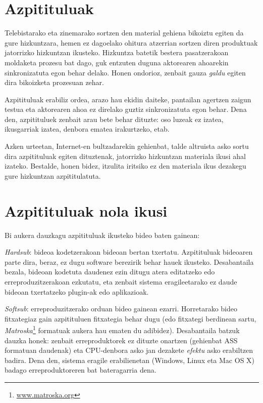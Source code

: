 \section{Azpitituluak}
Telebistarako eta zinemarako sortzen den material gehiena bikoiztu egiten da gure hizkuntzara, hemen ez dagoelako ohitura atzerrian sortzen diren produktuak jatorrizko hizkuntzan ikusteko. Hizkuntza batetik bestera pasatzerakoan moldaketa prozesu bat dago, guk entzuten duguna aktorearen ahoarekin sinkronizatuta egon behar delako. Honen ondorioz, zenbait gauza \textit{galdu} egiten dira bikoizketa prozesuan zehar.

Azpitituluak erabiliz ordea, arazo hau ekidin daiteke, pantailan agertzen zaigun testua eta aktorearen ahoa ez direlako guztiz sinkronizatuta egon behar. Dena den, azpitituluek zenbait arau bete behar dituzte: oso luzeak ez izatea, ikusgarriak izatea, denbora ematea irakurtzeko, etab.

Azken urteetan, Internet-en bultzadarekin gehienbat, talde altruista asko sortu dira azpitituluak egiten dituztenak, jatorrizko hizkuntzan materiala ikusi ahal izateko. Bestalde, honen bidez, itzulita iritsiko ez den materiala ikus dezakegu gure hizkuntzan azpititulatuta.

\section{Azpitituluak nola ikusi}
Bi aukera dauzkagu azpitituluak ikusteko bideo baten gainean:

\textit{Hardsub}: bideoa kodetzerakoan bideoan bertan txertatu. Azpitituluak bideoaren parte dira, beraz, ez dugu software berezirik behar hauek ikusteko. Desabantaila bezala, bideoan kodetuta daudenez ezin ditugu atera editatzeko edo erreproduzitzerakoan ezkutatu, eta zenbait sistema eragileetarako ez daude bideoan txertatzeko plugin-ak edo aplikazioak.

\textit{Softsub}: erreproduzitzerako orduan bideo gainean ezarri. Horretarako bideo fitxategiaz gain azpitituluen fitxategia behar dugu (edo fitxategi berdinean sartu, \textit{Matroska}\footnote{\url{www.matroska.org}} formatuak aukera hau ematen du adibidez). Desabantaila batzuk dauzka honek: zenbait erreproduktorek ez dituzte onartzen (gehienbat ASS formatuan daudenak) eta CPU-denbora asko jan dezakete \textit{efektu} asko erabiltzen badira. Dena den, sistema eragile erabilienetan (Windows, Linux eta Mac OS X) badago erreproduktoreren bat bateragarria dena.

